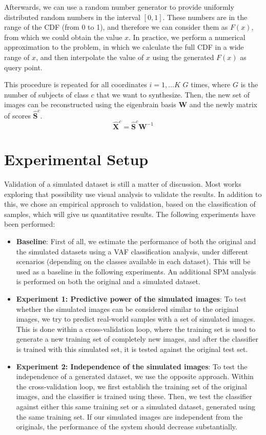 Afterwards, we can use a random number generator to provide uniformly distributed random numbers in the interval $[0,1]$. These numbers are in the range of the \ac{CDF} (from 0 to 1), and therefore we can consider them as $F(x)$, from which we could obtain the value $x$. In practice, we perform a numerical approximation to the problem, in which we calculate the full \ac{CDF} in a wide range of $x$, and then interpolate the value of $x$ using the generated $F(x)$ as query point. 

This procedure is repeated for all coordinates $i=1,\dots K$ $G$ times, where $G$ is the number of subjects of class $c$ that we want to synthesize. Then, the new set of images can be reconstructed using the eigenbrain basis $\mathbf{W}$ and the newly matrix of scores $\widehat{\mathbf{S}}^c$. 
\begin{equation}
\widehat{\mathbf{X}}^c =\widehat{\mathbf{S}}^c\mathbf{W}^{-1} 
\end{equation}

\section{Experimental Setup}
Validation of a simulated dataset is still a matter of discussion. Most works exploring that possibility \cite{Ma1993,KwanEvansPike1999} use visual analysis to validate the results. In addition to this, we chose an empirical approach to validation, based on the classification of samples, which will give us quantitative results. The following experiments have been performed: 

\begin{itemize}
	\item \textbf{Baseline}: First of all, we estimate the performance of both the original and the simulated datasets using a \ac{VAF} \cite{Stoeckel04} classification analysis, under different scenarios (depending on the classes available in each dataset). This will be used as a baseline in the following experiments. An additional \ac{SPM} \cite{spm_book} analysis is performed on both the original and a simulated dataset. 
	\item \textbf{Experiment 1: Predictive power of the simulated images}: To test whether the simulated images can be considered similar to the original images, we try to predict real-world samples with a set of simulated images. This is done within a cross-validation loop, where the training set is used to generate a new training set of completely new images, and after the classifier is trained with this simulated set, it is tested against the original test set.  
	\item \textbf{Experiment 2: Independence of the simulated images}: To test the independence of a generated dataset, we use the opposite approach. Within the cross-validation loop, we first establish the training set of the original images, and the classifier is trained using these. Then, we test the classifier against either this same training set or a simulated dataset, generated using the same training set. If our simulated images are independent from the originals, the performance of the system should decrease substantially. 
\end{itemize}

